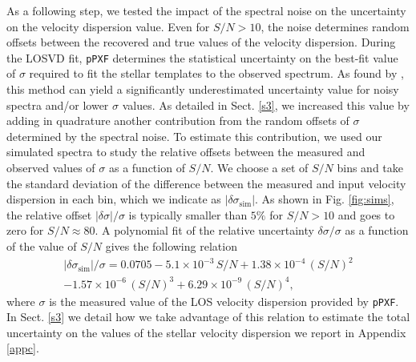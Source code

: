 \documentclass{aa}
\begin{document}
\begin{appendix}
As a following step, we tested the impact of the spectral noise on the uncertainty on the velocity dispersion value. Even for $S/N>10$, the noise determines random offsets between the recovered and true values of the velocity dispersion. During the LOSVD fit, \texttt{pPXF} determines the statistical uncertainty on the best-fit value of $\sigma$ required to fit the stellar templates to the observed spectrum. As found by \citet{cappellari04}, this method can yield a significantly underestimated uncertainty value for noisy spectra and/or lower $\sigma$ values. As detailed in Sect. \ref{s3}, we  increased this value by adding in quadrature another contribution from the random offsets of $\sigma$ determined by the spectral noise. To estimate this contribution, we used our simulated spectra to study the relative offsets between the measured and observed values of $\sigma$ as a function of $S/N$. We choose a set of $S/N$ bins and take the standard deviation of the difference between the measured and input velocity dispersion in each bin, which we indicate as $|\delta \sigma_\mathrm{sim}|$. As shown in Fig. \ref{fig:sims}, the relative offset $|\delta \sigma|/\sigma$ is typically smaller than $5\%$ for $S/N>10$ and goes to zero for $S/N\approx80$. A polynomial fit of the relative uncertainty $\delta \sigma/\sigma$ as a function of the value of $S/N$ gives the following relation
\begin{multline}\label{errapp}
    |\delta \sigma_\mathrm{sim}|/\sigma = 0.0705-5.1 \times 10^{-3}\, S/N+1.38\times10^{-4}\, (S/N)^2 \\-1.57\times 10^{-6}\, (S/N)^3+6.29\times 10^{-9}\, (S/N)^4,
\end{multline}
where $\sigma$ is the measured value of the LOS velocity dispersion provided by \texttt{pPXF}. In Sect. \ref{s3} we detail how we take advantage of this relation to estimate the total uncertainty on the values of the stellar velocity dispersion we report in Appendix \ref{appc}.


\end{appendix}
\end{document}
